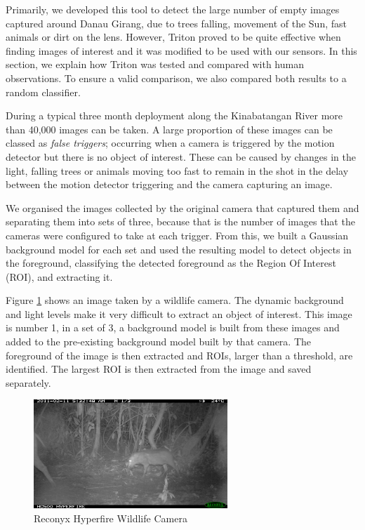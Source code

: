 		Primarily, we developed this tool to detect the large number of empty images captured around Danau Girang, due to trees falling, movement of the Sun, fast animals or dirt on the lens. However, Triton proved to be quite effective when finding images of interest and it was modified to be used with our sensors. In this section, we explain how Triton was tested and compared with human observations. To ensure a valid comparison, we also compared both results to a random classifier.
	
		During a typical three month deployment along the Kinabatangan River more than 40,000 images can be taken. A large proportion of these images can be classed as \textit{false triggers}; occurring when a camera is triggered by the motion detector but there is no object of interest. These can be caused by changes in the light, falling trees or animals moving too fast to remain in the shot in the delay between the motion detector triggering and the camera capturing an image.
		
		We organised the images collected by the original camera that captured them and separating them into sets of three, because that is the number of images that the cameras were configured to take at each trigger. From this, we built a Gaussian background model \cite{REFERENCE} for each set and used the resulting model to detect objects in the foreground, classifying the detected foreground as the Region Of Interest (ROI), and extracting it.
	
		Figure \ref{tech:reconyx} shows an image taken by a wildlife camera. The dynamic background and light levels make it very difficult to extract an object of interest. This image is number 1, in a set of 3, a background model is built from these images and added to the pre-existing background model built by that camera. The foreground of the image is then extracted and ROIs, larger than a threshold, are identified. The largest ROI is then extracted from the image and saved separately.

			\begin{figure}[h]
			\centering
			\includegraphics[width=0.65\textwidth]{Chap3/figures/reconyx.jpg}
			\caption{Reconyx Hyperfire Wildlife Camera}
			\label{tech:reconyx}
			\end{figure}
	
